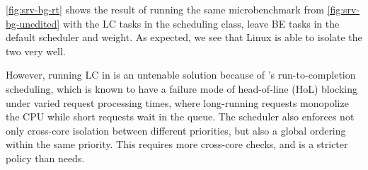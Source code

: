 \autoref{fig:srv-bg-rt} shows the result of running the same microbenchmark from
\autoref{fig:srv-bg-unedited} with the LC tasks in the \fifoclass{} scheduling
class, leave BE tasks in the default \normalclass{} scheduler and weight. As
expected, we see that Linux is able to isolate the two very well.

However, running LC in \fifoclass{} is an untenable solution because of
\fifoclass{}'s run-to-completion scheduling, which is known to have a failure
mode of head-of-line (HoL) blocking under varied request processing times, where
long-running requests monopolize the CPU while short requests wait in the queue.
The \fifoclass{} scheduler also enforces not only cross-core isolation between
different priorities, but also a global ordering within the same priority. This
requires more cross-core checks, and is a stricter policy than \beclass{} needs.


